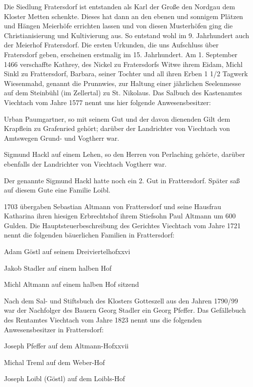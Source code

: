 \documentclass{book}
\begin{document}
Die Siedlung Fratersdorf ist entstanden als Karl der Große den Nordgau dem
Kloster Metten schenkte. Dieses hat dann an den ebenen und sonnigem Plätzen und
Hängen Meierhöfe errichten lassen und von diesen Musterhöfen ging die
Christianisierung und Kultivierung aus. So entstand wohl im 9. Jahrhundert auch
der Meierhof Fratersdorf. Die ersten Urkunden, die uns Aufschluss über
Fratersdorf geben, erscheinen erstmalig im 15. Jahrhundert. Am 1. September 1466
verschaffte Kathrey, des Nickel zu Fratersdorfs Witwe ihrem Eidam, Michl Sinkl
zu Frattersdorf, Barbara, seiner Tochter und all ihren Erben 1 1/2 Tagwerk
Wiesenmahd, genannt die Prunnwies, zur Haltung einer jährlichen Seelenmesse auf
dem Steinbühl (im Zellertal) zu St. Nikolaus. Das Salbuch des Kastenamtes
Viechtach vom Jahre 1577 nennt uns hier folgende Anwesensbesitzer:

Urban Paumgartner, so mit seinem Gut und der davon dienenden Gilt dem Krapflein
zu Grafenried gehört; darüber der Landrichter von Viechtach von Amtswegen Grund-
und Vogtherr war.

Sigmund Hackl auf einem Lehen, so den Herren von Perlaching gehörte, darüber
ebenfalls der Landrichter von Viechtach Vogtherr war.

Der genannte Sigmund Hackl hatte noch ein 2. Gut in Frattersdorf. Später saß auf
diesem Gute eine Familie Loibl.


1703 übergaben Sebastian Altmann von Frattersdorf und seine Hausfrau Katharina
ihren hiesigen Erbrechtshof ihrem Stiefsohn Paul Altmann um 600 Gulden. Die
Hauptsteuerbeschreibung des Gerichtes Viechtach vom Jahre 1721 nennt die
folgenden bäuerlichen Familien in Frattersdorf:



Adam Göstl auf seinem Dreiviertelhofxxvi

Jakob Stadler auf einem halben Hof

Michl Altmann auf einem halben Hof sitzend



Nach dem Sal- und Stiftsbuch des Klosters Gotteszell aus den Jahren 1790/99 war
der Nachfolger des Bauern Georg Stadler ein Georg Pfeffer. Das Gefällebuch des
Rentamtes Viechtach vom Jahre 1823 nennt uns die folgenden Anwesensbesitzer in
Frattersdorf:



Joseph Pfeffer auf dem Altmann-Hofxxvii

Michal Treml auf dem Weber-Hof

Joseph Loibl (Göstl) auf dem Loibls-Hof
\end{document}
